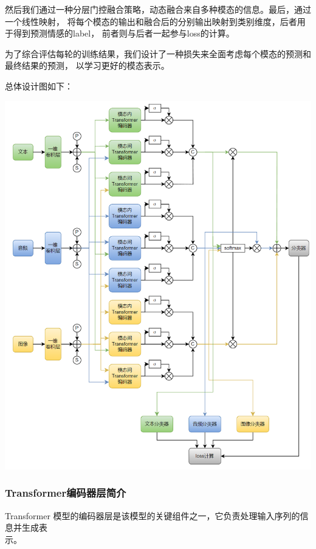 \documentclass[11pt]{article}
\begin{document}
            然后我们通过一种分层门控融合策略，动态融合来自多种模态的信息。最后，通过一个线性映射，
            将每个模态的输出和融合后的分别输出映射到类别维度，后者用于得到预测情感的label，
            前者则与后者一起参与loss的计算。
            
            为了综合评估每轮的训练结果，我们设计了一种损失来全面考虑每个模态的预测和最终结果的预测，
            以学习更好的模态表示。
            
            总体设计图如下：
            
            \begin{center}
                \includegraphics[scale = 0.5]{graph/transformer5.png}
            \end{center}
            
            \subsubsection{Transformer编码器层简介}
            Transformer 模型的编码器层是该模型的关键组件之一，它负责处理输入序列的信息并生成表\\示。
\end{document}
